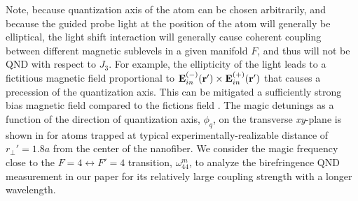 \documentclass[preprint,aps,pra,onecolumn]{revtex4-1} %
\newcommand{\comment}[1]{{\color{Maroon} #1}}
\begin{document}
Note, because quantization axis of the atom can be chosen arbitrarily, and because the guided probe light at the position of the atom will generally be elliptical, the light shift interaction will generally cause coherent coupling between different magnetic sublevels in a given manifold $F$, and thus will not be QND with respect to $J_3$.  For example, the ellipticity of the light leads to a fictitious magnetic field proportional to $\mathbf{E}^{(-)}_{in}(\mathbf{r}') \times \mathbf{E}^{(+)}_{in}(\mathbf{r}')$ that causes a precession of the quantization axis.  This can be mitigated a sufficiently strong bias magnetic field compared to the fictions field \cite{smith_continuous_2004}. 
The magic detunings as a function of the direction of quantization axis, $ \phi_q $, on the transverse \emph{xy}-plane is shown in  for atoms trapped at typical experimentally-realizable \cite{} distance of $r_\perp'=1.8a$ from the center of the nanofiber. 
We consider the magic frequency close to the $ F=4\leftrightarrow F'=4 $ transition, $ \omega_{44}^m $, to analyze the birefringence QND measurement in our paper for its relatively large coupling strength with a longer wavelength.
\end{document}
